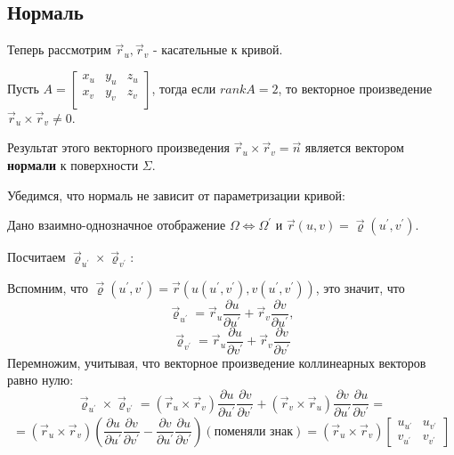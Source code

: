 \documentclass[12pt]{article}
\begin{document}
\subsection{Нормаль}
Теперь рассмотрим $\overrightarrow{r}_u, \overrightarrow{r}_v$ - касательные к кривой.\par
Пусть $A = \begin{bmatrix}
   x_u & y_u & z_u \\
   x_v & y_v & z_v \\
\end{bmatrix}$, тогда если $rank A = 2$, то векторное произведение $\overrightarrow{r}_u \times \overrightarrow{r}_v \neq 0$.\par
Результат этого векторного произведения $\overrightarrow{r}_u \times \overrightarrow{r}_v = \overrightarrow{n}$ является вектором \textbf{нормали} к поверхности $\Sigma$.\par
Убедимся, что нормаль не зависит от параметризации кривой:\par
Дано взаимно-однозначное отображение $\Omega \iff \Omega^{'}$ и $\overrightarrow{r}(u,v) = \overrightarrow{\varrho}(u^{'},v^{'})$.\par
Посчитаем $\overrightarrow{\varrho}_{u^{'}} \times \overrightarrow{\varrho}_{v^{'}}$:\par
Вспомним, что $\overrightarrow{\varrho}(u^{'},v^{'}) = \overrightarrow{r}(u(u^{'},v^{'}),v(u^{'},v^{'}))$, это значит, что
$$\overrightarrow{\varrho}_{u^{'}} = \overrightarrow{r}_u \frac{\partial u}{\partial u^{'}} + \overrightarrow{r}_v \frac{\partial v}{\partial u^{'}},$$
$$\overrightarrow{\varrho}_{v^{'}} = \overrightarrow{r}_u \frac{\partial u}{\partial v^{'}} + \overrightarrow{r}_v \frac{\partial v}{\partial v^{'}}$$
Перемножим, учитывая, что векторное произведение коллинеарных векторов равно нулю:
$$\overrightarrow{\varrho}_{u^{'}} \times \overrightarrow{\varrho}_{v^{'}} = (\overrightarrow{r}_u \times \overrightarrow{r}_v) \frac{\partial u}{\partial u^{'}} \frac{\partial v}{\partial v^{'}} + (\overrightarrow{r}_v \times \overrightarrow{r}_u) \frac{\partial v}{\partial u^{'}} \frac{\partial u}{\partial v^{'}} = $$
$$ = (\overrightarrow{r}_u \times \overrightarrow{r}_v) (\frac{\partial u}{\partial u^{'}} \frac{\partial v}{\partial v^{'}}-\frac{\partial v}{\partial u^{'}} \frac{\partial u}{\partial v^{'}}) (\text{поменяли знак}) = (\overrightarrow{r}_u \times \overrightarrow{r}_v) \begin{bmatrix} u_{u^{'}} & u_{v^{'}} \\ v_{u^{'}} & v_{v^{'}} \end{bmatrix}$$
\end{document}
